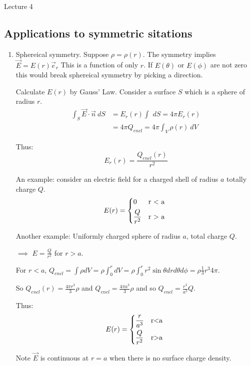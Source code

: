 \begin{center}

Lecture 4

\end{center}

\subsection{Applications to symmetric sitations}

\begin{enumerate}
\item Sphereical symmetry. Suppose $\rho = \rho(r)$. The symmetry implies $\vec{E} = E(r) \vec{e}_r$ This is a function of only $r$. If $E(\theta)$ or $E(\phi)$ are not zero this would break sphereical symmetry by picking a direction.

Calculate $E(r)$ by Gauss' Law. Consider a surface $S$ which is a sphere of radius $r$.
\begin{align*}
\int_S \vec{E}\cdot \vec{n} ~dS &= E_r(r) \int \,\, dS = 4 \pi E_r(r) \\
&= 4 \pi Q_{encl} = 4\pi \int _V \rho (r) ~dV
\end{align*}

Thus: 
\begin{equation}
E_r(r) = \frac{Q_{encl} (r)}{r^2}
\end{equation}

An example: consider an electric field for a charged shell of radius $a$ totally charge $Q$. 
\[
E(r) = \begin{dcases*}
0 & r < a \\
\frac{Q}{r^2} & r > a
\end{dcases*}
\]

Another example: Uniformly charged sphere of radius $a$, total charge $Q$.

$\implies$ $E = \frac{Q}{r^2}$ for $r > a$.

For $r<a$, $Q_{encl} = \int \rho dV = \rho \int_0^r dV = \rho \int_0^r r^2 \sin \theta dr d\theta d\phi = \rho \frac{1}{3} r^3 4 \pi$.

So $Q_{encl} (r) = \frac{4 \pi r^3}{3} \rho$ and $Q_{encl} = \frac{4\pi a^3}{3} \rho$ and so $Q_{encl} = \frac{r^3}{a^3} Q$.

Thus: \[
E(r) = \begin{dcases*}
\frac{r}{a^3} & r<a \\
\frac{Q}{r^2} & r>a 
\end{dcases*}
\]

Note $\vec{E}$ is continuous at $r=a$ when there is no surface charge density.


\end{enumerate}
